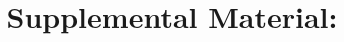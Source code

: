 \documentclass[aps,prl,reprint,onecolumn,11pt,tightenlines,floatfix]{revtex4-2}
\begin{document}
\title{Supplemental Material: \ManuscriptTitle}\maketitle\LayoutAudit

\end{document}
